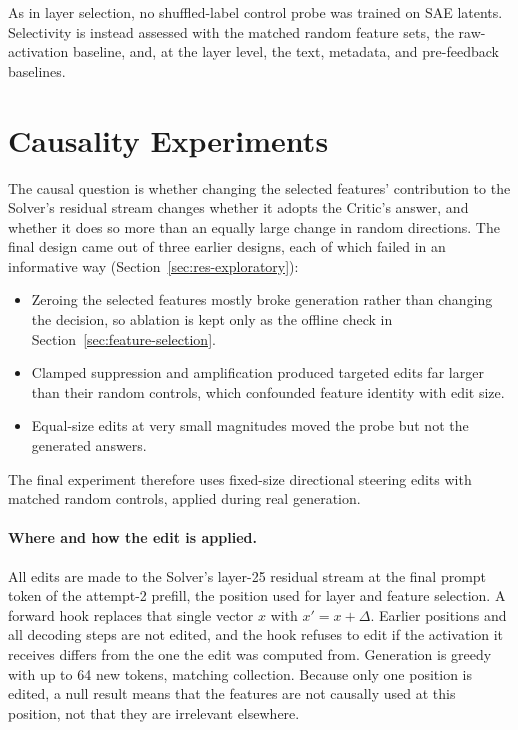 As in layer selection, no shuffled-label control probe was trained on SAE
latents. Selectivity is instead assessed with the matched random feature sets,
the raw-activation baseline, and, at the layer level, the text, metadata, and
pre-feedback baselines.

\section{Causality Experiments}
\label{sec:causal-methods}

The causal question is whether changing the selected features' contribution
to the Solver's residual stream changes whether it adopts the Critic's answer,
and whether it does so more than an equally large change in random
directions. The final design came out of three earlier designs, each of which
failed in an informative way (Section~\ref{sec:res-exploratory}):
\begin{itemize}[nosep]
    \item Zeroing the selected features mostly broke generation rather than
    changing the decision, so ablation is kept only as the offline check in
    Section~\ref{sec:feature-selection}.
    \item Clamped suppression and amplification produced targeted edits far
    larger than their random controls, which confounded feature identity with
    edit size.
    \item Equal-size edits at very small magnitudes moved the probe but not
    the generated answers.
\end{itemize}
The final experiment therefore uses fixed-size directional steering edits
with matched random controls, applied during real generation.

\paragraph{Where and how the edit is applied.} All edits are made to the
Solver's layer-25 residual stream at the final prompt token of the attempt-2
prefill, the position used for layer and feature selection. A forward hook
replaces that single vector $x$ with $x'=x+\Delta$. Earlier positions and all
decoding steps are not edited, and the hook refuses to edit if the activation
it receives differs from the one the edit was computed from. Generation is
greedy with up to 64 new tokens, matching collection. Because only one
position is edited, a null result means that the features are not causally
used at this position, not that they are irrelevant elsewhere.

